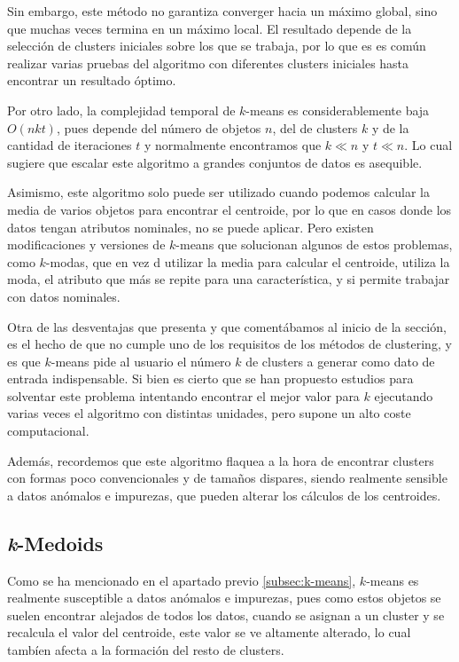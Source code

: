 \documentclass[3p,twocolumn]{elsarticle}
\begin{document}
Sin embargo, este método no garantiza converger hacia un máximo global, sino que muchas veces termina en un máximo local. El resultado depende de la selección de clusters iniciales sobre los que se trabaja, por lo que es es común realizar varias pruebas del algoritmo con diferentes clusters iniciales hasta encontrar un resultado óptimo. 

Por otro lado, la complejidad temporal de $k$-means es considerablemente baja  $O(nkt)$, pues depende del número de objetos $n$, del de clusters $k$ y de la cantidad de iteraciones $t$ y normalmente encontramos que $k \ll n$ y $t \ll n$. Lo cual sugiere que escalar este algoritmo a grandes conjuntos de datos es asequible.

Asimismo, este algoritmo solo puede ser utilizado cuando podemos calcular la media de varios objetos para encontrar el centroide, por lo que en casos donde los datos tengan atributos nominales, no se puede aplicar. Pero existen modificaciones y versiones de $k$-means que solucionan algunos de estos problemas, como $k$-modas, que en vez d utilizar la media para calcular el centroide, utiliza la moda, el atributo que más se repite para una característica, y si permite trabajar con datos nominales.

Otra de las desventajas que presenta y que comentábamos al inicio de la sección, es el hecho de que no cumple uno de los requisitos de los métodos de clustering, y es que $k$-means pide al usuario el número $k$ de clusters a generar como dato de entrada indispensable. Si bien es cierto que se han propuesto estudios para solventar este problema intentando encontrar el mejor valor para $k$ ejecutando varias veces el algoritmo con distintas unidades, pero supone un alto coste computacional. 

Además, recordemos que este algoritmo flaquea a la hora de encontrar clusters con formas poco convencionales y de tamaños dispares, siendo realmente sensible a datos anómalos e impurezas, que pueden alterar los cálculos de los centroides.




\subsection{\textbf{\textit{k}-Medoids}} \label{subsec:k-Medoids}

Como se ha mencionado en el apartado previo \ref{subsec:k-means}, $k$-means es realmente susceptible a datos anómalos e impurezas, pues como estos objetos se suelen encontrar alejados de todos los datos, cuando se asignan a un cluster y se recalcula el valor del centroide, este valor se ve altamente alterado, lo cual tambíen afecta a la formación del resto de clusters.
\end{document}
